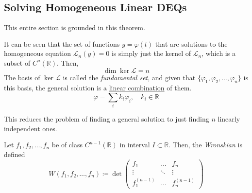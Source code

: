 \documentclass{article}
\newcounter{theorem}[section]
\newcounter{definition}[section]
\begin{document}
  \subsection{Solving Homogeneous Linear DEQs}

    This entire section is grounded in this theorem. 
    \begin{theorem}
      \label{thm:the-fundamental-set}
    It can be seen that the set of functions $y = \varphi(t)$ that are solutions to the homogeneous equation $\mathcal{L}_n (y) = 0$ is simply just the kernel of $\mathcal{L}_n$, which is a subset of $C^n (\mathbb{R})$. Then, 
    \begin{equation}
      \dim \ker{\mathcal{L}} = n
    \end{equation}
    The basis of $\ker{\mathcal{L}}$ is called the \textit{fundamental set}, and given that $\{\varphi_1, \varphi_2, \ldots, \varphi_n\}$ is this basis, the general solution is a \hyperref[lin-def:linear-combination]{linear combination} of them. 
    \begin{equation}
      \varphi = \sum_i k_i \varphi_i, \quad k_i \in \mathbb{R}
    \end{equation}
    \end{theorem}

    This reduces the problem of finding a general solution to just finding $n$ linearly independent ones. 

    \begin{definition}[Wronskian]
      \label{def:wronskian}
    Let $f_1, f_2, \ldots, f_n$ be of class $C^{n-1} (\mathbb{R})$ in interval $I \subset \mathbb{R}$. Then, the \textit{Wronskian} is defined
    \begin{equation}
      W(f_1, f_2, \ldots, f_n) \coloneqq \det{\begin{pmatrix}
          f_1&\ldots&f_n\\
          \vdots&\ddots&\vdots\\
          f_1^{(n-1)}&\ldots&f_n^{(n-1)}
          \end{pmatrix}}
    \end{equation}
    \end{definition}
\end{document}
